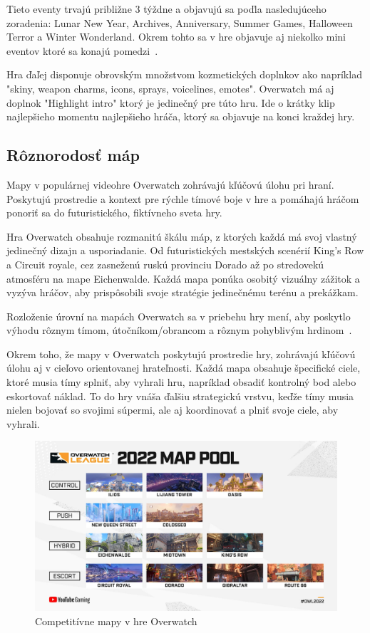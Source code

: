 \documentclass[10pt,oneside,slovak,a4paper]{article}
\begin{document}
Tieto eventy trvajú približne 3 týždne a objavujú sa poďla nasledujúceho
zoradenia: Lunar New Year, Archives, Anniversary, Summer Games, Halloween Terror a Winter Wonderland. Okrem tohto sa v hre objavuje aj niekolko mini eventov ktoré sa konajú pomedzi~\cite{Overwatchbook}.



Hra ďaľej disponuje obrovským množstvom kozmetických doplnkov ako napríklad "skiny, weapon charms, icons, sprays, voicelines, emotes". Overwatch
má aj doplnok "Highlight intro" ktorý je jedinečný pre túto hru. Ide o krátky klip najlepšieho momentu najlepšieho hráča, ktorý sa objavuje na konci kraždej hry.




\subsection{Rôznorodosť máp} \label{Rôznorodosť máp}

Mapy v populárnej videohre Overwatch zohrávajú kľúčovú úlohu pri hraní. Poskytujú prostredie a kontext pre rýchle tímové boje v hre a pomáhajú hráčom ponoriť sa do futuristického, fiktívneho sveta hry.

Hra Overwatch obsahuje rozmanitú škálu máp, z ktorých každá má svoj vlastný jedinečný dizajn a usporiadanie. Od futuristických mestských scenérií King's Row a Circuit royale, cez zasneženú ruskú provinciu Dorado až po stredovekú atmosféru na mape Eichenwalde. Každá mapa ponúka osobitý vizuálny zážitok a vyzýva hráčov, aby prispôsobili svoje stratégie jedinečnému terénu a prekážkam.

Rozloženie úrovní na mapách Overwatch sa v priebehu hry mení, aby poskytlo výhodu rôznym tímom, útočníkom/obrancom a rôznym pohyblivým hrdinom~\cite{Overwatchmaps}.

Okrem toho, že mapy v Overwatch poskytujú prostredie hry, zohrávajú kľúčovú úlohu aj v cieľovo orientovanej hrateľnosti. Každá mapa obsahuje špecifické ciele, ktoré musia tímy splniť, aby vyhrali hru, napríklad obsadiť kontrolný bod alebo eskortovať náklad. To do hry vnáša ďalšiu strategickú vrstvu, keďže tímy musia nielen bojovať so svojimi súpermi, ale aj koordinovať a plniť svoje ciele, aby vyhrali.

\begin{figure}[h!]
\includegraphics[scale=0.165]{images/overwatch_maps.png}
\caption{Competitívne mapy v hre Overwatch}
\end{figure}
\end{document}
